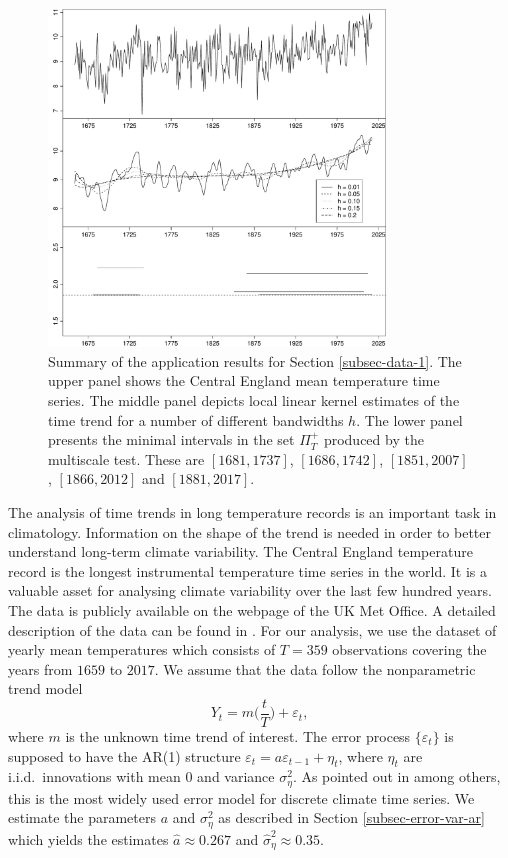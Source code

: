 \documentclass[a4paper,12pt]{article}
\begin{document}
\begin{figure}[t]
\centering
\includegraphics[width=0.8\textwidth]{Plots/threegraphics_testing_constant_method_ll.pdf}
\caption{Summary of the application results for Section \ref{subsec-data-1}. The upper panel shows the Central England mean temperature time series. The middle panel depicts local linear kernel estimates of the time trend for a number of different bandwidths $h$. The lower panel presents the minimal intervals in the set $\Pi_T^+$ produced by the multiscale test. These are $[1681,1737]$, $[1686,1742]$, $[1851,2007]$, $[1866,2012]$ and $[1881,2017]$.}\label{plot-results-app1}
\end{figure}


\enlargethispage{0.2cm}
The analysis of time trends in long temperature records is an important task in climatology. Information on the shape of the trend is needed in order to better understand long-term climate variability. The Central England temperature record is the longest instrumental temperature time series in the world. It is a valuable asset for analysing climate variability over the last few hundred years. The data is publicly available on the webpage of the UK Met Office. A detailed description of the data can be found in \cite{Parker1992}. For our analysis, we use the dataset of yearly mean temperatures which consists of $T=359$ observations covering the years from $1659$ to $2017$. We assume that the data follow the nonparametric trend model 
\[ Y_t = m\Big(\frac{t}{T}\Big) + \varepsilon_t, \]
where $m$ is the unknown time trend of interest. The error process $\{ \varepsilon_t \}$ is supposed to have the AR(1) structure $\varepsilon_t = a \varepsilon_{t-1} + \eta_t$, where $\eta_t$ are i.i.d.\ innovations with mean $0$ and variance $\sigma_\eta^2$. As pointed out in \cite{Mudelsee2010} among others, this is the most widely used error model for discrete climate time series. We estimate the parameters $a$ and $\sigma_\eta^2$ as described in Section \ref{subsec-error-var-ar} which yields the estimates $\widehat{a} \approx 0.267$ and $\widehat{\sigma}_\eta^2 \approx 0.35$.
\end{document}

